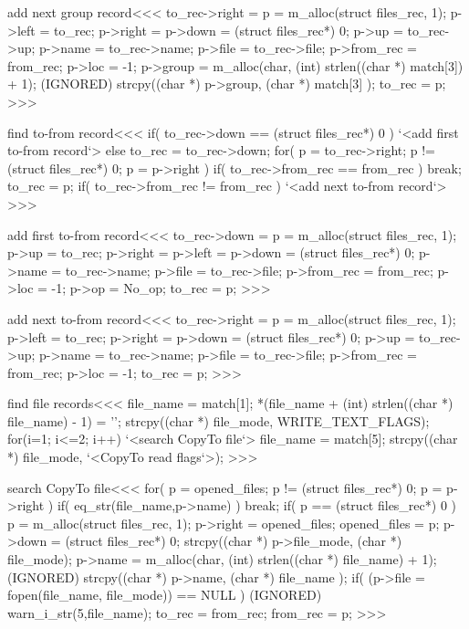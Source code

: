 \<add next group record\><<<
to_rec->right = p = m_alloc(struct files_rec, 1);
p->left = to_rec;
p->right = p->down = (struct files_rec*) 0;
p->up = to_rec->up;
p->name = to_rec->name;  
p->file = to_rec->file;  
p->from_rec = from_rec;  
p->loc = -1;  
p->group = m_alloc(char, (int) strlen((char *) match[3]) + 1);
(IGNORED) strcpy((char *)  p->group, (char *) match[3] );
to_rec = p;
>>>



\<find to-from record\><<<
if( to_rec->down == (struct files_rec*) 0 ){
  `<add first to-from record`>
} else {
  to_rec = to_rec->down;
  for( p = to_rec->right; p != (struct files_rec*) 0;  p = p->right ){
    if( to_rec->from_rec == from_rec ){ break; }
    to_rec = p;
  }
  if( to_rec->from_rec != from_rec ){ 
    `<add next to-from record`>
} }
>>>

\<add first to-from record\><<<
to_rec->down = p = m_alloc(struct files_rec, 1);  
p->up = to_rec;
p->right = p->left = p->down = (struct files_rec*) 0;
p->name = to_rec->name;  
p->file = to_rec->file;  
p->from_rec = from_rec;  
p->loc = -1;  
p->op = No_op;
to_rec = p;
>>>

\<add next to-from record\><<<
to_rec->right = p = m_alloc(struct files_rec, 1);
p->left = to_rec;
p->right = p->down = (struct files_rec*) 0;
p->up = to_rec->up;
p->name = to_rec->name;  
p->file = to_rec->file;  
p->from_rec = from_rec;  
p->loc = -1;  
to_rec = p;
>>>


\<find file records\><<<
file_name = match[1];  
*(file_name + (int) strlen((char *) file_name) - 1) = '\0';
strcpy((char *) file_mode, WRITE_TEXT_FLAGS);
for(i=1; i<=2; i++){
  `<search CopyTo file`>
  file_name = match[5];  
  strcpy((char *) file_mode, `<CopyTo read flags`>);
}
>>>









\<search CopyTo file\><<<
for( p = opened_files; p != (struct files_rec*) 0;  p = p->right ){
   if( eq_str(file_name,p->name) ) { break; }
}
if( p == (struct files_rec*) 0 ){
  p = m_alloc(struct files_rec, 1);
  p->right = opened_files;   opened_files = p;
  p->down =  (struct files_rec*) 0;
  strcpy((char *) p->file_mode, (char *) file_mode);
  p->name = m_alloc(char, (int) strlen((char *) file_name) + 1);
  (IGNORED) strcpy((char *)  p->name, (char *) file_name );
  if( (p->file = fopen(file_name, file_mode)) == NULL )
    { (IGNORED) warn_i_str(5,file_name); }
} 
to_rec = from_rec;  from_rec = p;
>>>


